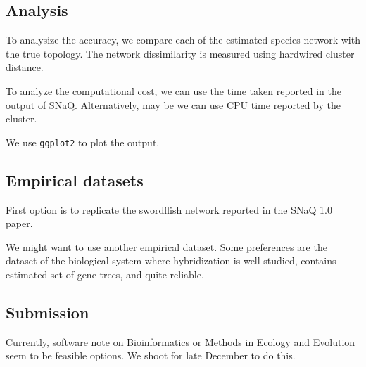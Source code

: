 \documentclass{article}
\begin{document}
\subsection{Analysis}
To analysize the accuracy, we compare each of the estimated species network with the true topology. The network dissimilarity is measured using hardwired cluster distance. 

To analyze the computational cost, we can use the time taken reported in the output of SNaQ. Alternatively, may be we can use CPU time reported by the cluster.

We use \texttt{ggplot2} to plot the output.

\subsection{Empirical datasets}
First option is to replicate the swordflish network reported in the SNaQ 1.0 paper.

We might want to use another empirical dataset. Some preferences are the dataset of the biological system where hybridization is well studied, contains estimated set of gene trees, and quite reliable.

\subsection{Submission}
Currently, software note on Bioinformatics or Methods in Ecology and Evolution seem to be feasible options. We shoot for late December to do this.
\end{document}
